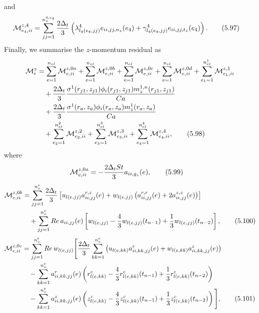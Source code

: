 \documentclass{article}
\begin{document}
and
\begin{align}
\mathcal{M}_{e_4,ii}^{z,4} &= \sum_{jj=1}^{n_v^{4,e_4}} \frac{2\Delta_t}{3} \left( \lambda_{l_4(e_4,jj)}^4 e_{ii,jj,n_z}(e_4) + \gamma_{l_4(e_4,jj)}^4 e_{ii,jj,t_z}(e_4) \right). \tag{5.97}
\end{align}
Finally, we summarise the $z$-momentum residual as
\begin{align}
\mathcal{M}_i^z &= \sum_{e=1}^{n_{el}} \mathcal{M}_{e,ii}^{z,0a} + \sum_{e=1}^{n_{el}} \mathcal{M}_{e,ii}^{z,0b} + \sum_{e=1}^{n_{el}} \mathcal{M}_{e,ii}^{z,0c} + \sum_{e=1}^{n_{el}} \mathcal{M}_{e,ii}^{z,0d} + \sum_{e_1=1}^{n_{el}^1} \mathcal{M}_{e_1,ii}^{z,1} \nonumber\\
&\quad + \frac{2\Delta_t}{3} \frac{\sigma^1(r_{j1},z_{j1}) \phi_i(r_{j1},z_{j1}) m_z^{1,n}(r_{j1},z_{j1})}{Ca} \nonumber\\
&\quad + \frac{2\Delta_t}{3} \frac{\sigma^1(r_a,z_a) \phi_i(r_a,z_a) m_z^{1}(r_a,z_a)}{Ca} \nonumber\\
&\quad + \sum_{e_2=1}^{n_{el}^2} \mathcal{M}_{e_2,ii}^{z,2} + \sum_{e_3=1}^{n_{el}^3} \mathcal{M}_{e_3,ii}^{z,3} + \sum_{e_4=1}^{n_{el}^4} \mathcal{M}_{e_4,ii}^{z,4}, \tag{5.98}
\end{align}
where
\begin{align}
\mathcal{M}_{e,ii}^{z,0a} &= -\frac{2\Delta_t St}{3} a_{ii,g_z}(e), \tag{5.99}
\end{align}
\begin{align}
\mathcal{M}_{e,ii}^{z,0b} &= \sum_{jj=1}^{n_v^e} \frac{2\Delta_t}{3} \left[ u_{l(e,jj)} a_{ii,jj}^{r,z}(e) + w_{l(e,jj)} \left( a_{ii,jj}^{r,r}(e) + 2 a_{ii,jj}^{z,z}(e) \right) \right] \nonumber\\
&\quad + \sum_{jj=1}^{n_v^e} Re\, a_{ii,jj}(e) \left[ w_{l(e,jj)} - \frac{4}{3} w_{l(e,jj)}(t_{n-1}) + \frac{1}{3} w_{l(e,jj)}(t_{n-2}) \right], \tag{5.100}
\end{align}
\begin{align}
\mathcal{M}_{e,ii}^{z,0c} &= \sum_{jj=1}^{n_v^e} Re\, w_{l(e,jj)} \Bigg[ \frac{2\Delta_t}{3} \sum_{kk=1}^{n_v^e} \left( u_{l(e,kk)} a_{ii,kk,jj}^r(e) + w_{l(e,kk)} a_{ii,kk,jj}^z(e) \right) \nonumber\\
&\quad - \sum_{kk=1}^{n_v^e} a_{ii,kk,jj}^r(e) \left( r_{l(e,kk)}^c - \frac{4}{3} r_{l(e,kk)}^c(t_{n-1}) + \frac{1}{3} r_{l(e,kk)}^c(t_{n-2}) \right) \nonumber\\
&\quad - \sum_{kk=1}^{n_v^e} a_{ii,kk,jj}^z(e) \left( z_{l(e,kk)}^c - \frac{4}{3} z_{l(e,kk)}^c(t_{n-1}) + \frac{1}{3} z_{l(e,kk)}^c(t_{n-2}) \right) \Bigg], \tag{5.101}
\end{align}
\end{document}
